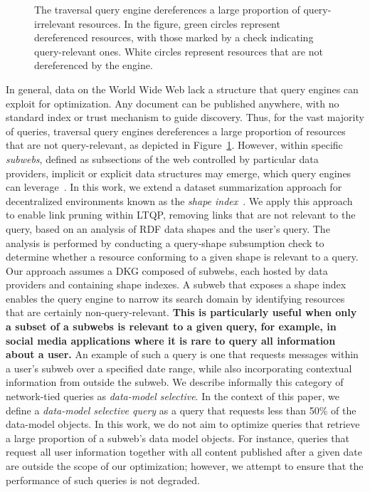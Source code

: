 \begin{figure}
    \centering
    
    \caption{
    The traversal query engine dereferences a large proportion of query-irrelevant resources. 
    In the figure, green circles represent dereferenced resources, with those marked by a check indicating query-relevant ones. 
    White circles represent resources that are not dereferenced by the engine.
    }
    \label{fig:situation}
\end{figure}

In general, data on the World Wide Web lack a structure that query engines can exploit for optimization.  
Any document can be published anywhere, with no standard index or trust mechanism to guide discovery.
Thus, for the vast majority of queries, traversal query engines dereferences a large proportion of resources that are not query-relevant, as depicted in Figure~\ref{fig:situation}.
However, within specific \emph{subwebs}, defined as subsections of the web controlled by particular data providers, implicit or explicit data structures may emerge, which query engines can leverage~\cite{Bogaerts2021LinkTW}.
In this work, we extend a dataset summarization approach for decentralized environments known as the \emph{shape index}~\cite{tam2024opportunitiesshapebasedoptimizationlink}.
We apply this approach to enable link pruning within LTQP, removing links that are not relevant to the query, based on an analysis of RDF data shapes and the user's query.
The analysis is performed by conducting a query-shape subsumption check to determine whether a resource conforming to a given shape is relevant to a query.
Our approach assumes a DKG composed of subwebs, each hosted by data providers and containing shape indexes.
A subweb that exposes a shape index enables the query engine to narrow its search domain by identifying resources that are certainly non-query-relevant.
\textbf{This is particularly useful when only a subset of a subwebs is relevant to a given query, for example, in social media applications where it is rare to query all information about a user.}
An example of such a query is one that requests messages within a user's subweb over a specified date range, while also incorporating contextual information from outside the subweb.
We describe informally this category of network-tied queries as \emph{data-model selective}.
In the context of this paper, we define a \emph{data-model selective query} as a query that requests less than 50\% of the data-model objects.
In this work, we do not aim to optimize queries that retrieve a large proportion of a subweb's data model objects.  
For instance, queries that request all user information together with all content published after a given date are outside the scope of our optimization; however, we attempt to ensure that the performance of such queries is not degraded.  

